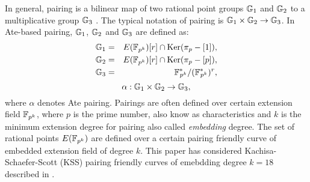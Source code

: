 In general, pairing is a bilinear map of two rational point groups ${\mathbb{G}}_{1}$ and ${\mathbb{G}}_{2}$ to a multiplicative group ${\mathbb{G}}_{3}$ \cite{Silverman}.
The typical notation of pairing is ${\mathbb{G}}_{1} \times {\mathbb{G}}_{2} \rightarrow {\mathbb{G}}_{3}$.
In  Ate-based pairing, ${\mathbb{G}}_{1}$, ${\mathbb{G}}_{2}$ and ${\mathbb{G}}_{3}$ are defined as:
\begin{eqnarray}\label{eq:g_1}
{\mathbb{G}}_{1} & = &  E({\mathbb{F}}_{p^{k}}) [r] \cap \text{Ker}(\pi_p - [1]), \nonumber \\
{\mathbb{G}}_{2} & = &  E({\mathbb{F}}_{p^{k}}) [r] \cap \text{Ker}(\pi_p - [p]), \nonumber \\
{\mathbb{G}}_{3} & = & {{\mathbb{F}}^{\ast}}_{\!\!\!p^{k}}/({{\mathbb{F}}^{\ast}}_{\!\!\!p^{k}})^r, \nonumber
\end{eqnarray}
\begin{equation}
\alpha : {\mathbb{G}}_{1} \times {\mathbb{G}}_{2} \rightarrow {\mathbb{G}}_{3},  \nonumber
\end{equation}
where $\alpha$ denotes Ate pairing.
Pairings are often defined over certain extension field $\mathbb{F}_{p^k}$, where $p$ is the prime number, also know as characteristics  and $k$  is the minimum extension degree for pairing also called \textit{embedding} degree. 
The set of rational points $E(\mathbb{F}_{p^k})$ are defined over a certain pairing friendly curve of embedded extension field of degree $k$.
This paper has considered Kachisa-Schaefer-Scott (KSS) \cite{kss} pairing friendly curves of emebdding degree $k=18$ described in \cite{taxonomy}.

